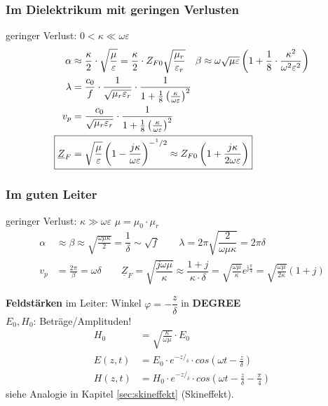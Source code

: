 \subsubsection{Im Dielektrikum mit geringen Verlusten}
geringer Verlust: $0 < \kappa \ll\omega\varepsilon$
\begin{align*}
	\alpha                  & \approx\dfrac{\kappa}{2}\cdot\sqrt{\dfrac{\mu}{\varepsilon}} = \frac{\kappa}{2}\cdot Z_{F0}\sqrt{\frac{\mu_r}{\varepsilon_r}}  \quad
	\beta \approx\omega\sqrt{\mu\varepsilon}\left(1+\dfrac{1}{8}\cdot\dfrac{\kappa^2}{\omega^2\varepsilon^2}\right)                                                                      \\
	\lambda                 & = \dfrac{c_0}{f}\cdot\dfrac{1}{\sqrt{\mu_r\varepsilon_r}}\cdot\frac{1}{1+\frac{1}{8}\left(\frac{\kappa}{\omega\varepsilon}\right)^2}                       \\
	v_p                     & = \dfrac{c_0}{\sqrt{\mu_r\varepsilon_r}}\cdot\frac{1}{1+\frac{1}{8}\left(\frac{\kappa}{\omega\varepsilon}\right)^2}                                        \\
	\Aboxed{\underline{Z}_F & = \sqrt{\dfrac{\mu}{\varepsilon}}\left(1-\frac{j\kappa}{\omega\varepsilon}\right)^{-^1/2} \approx Z_{F0}\left(1+\frac{j\kappa}{2\omega\varepsilon}\right)}
\end{align*}

\subsubsection{Im guten Leiter}\label{sec:Ausbreitug_guter_Leiter}
geringer Verlust: $\kappa \gg\omega\varepsilon$ \quad $\mu = \mu_0 \cdot \mu_r$
\begin{align*}
	\alpha & \approx \beta \approx\sqrt{\frac{\omega\mu\kappa}{2}}=\dfrac{1}{\delta}\sim\sqrt{f} \qquad
	\lambda                 = 2\pi \sqrt{\dfrac{2}{\omega\mu\kappa}}=2\pi\delta                         \\
	v_p    & = \frac{2\pi}{\beta} = \omega\delta        \qquad
	\boxed{\underline{Z}_F = \sqrt{\dfrac{j\omega\mu}{\kappa}} \approx \dfrac{1+j}{\kappa\cdot\delta} = \sqrt{\frac{\omega \mu}{\kappa}}e^{\mathrm{j}\frac{\pi}{4}} = \sqrt{\frac{\omega \mu}{2 \kappa}}(1+j)   }
\end{align*}

\textbf{Feldstärken} im Leiter: \qquad Winkel $\varphi = - \dfrac{z}{\delta}$ in \textbf{DEGREE}\\
$E_0, H_0$: Beträge/Amplituden!
\begin{align*}
	H_0    & = \sqrt{\frac{\kappa}{\omega \mu}}\cdot E_0                                    \\
	E(z,t) & = E_0 \cdot e^{- z/_\delta}\cdot cos(\omega t-\frac{z}{\delta})                \\
	H(z,t) & = H_0 \cdot e^{- z/_\delta}\cdot cos(\omega t- \frac{z}{\delta}-\frac{\pi}{4})
\end{align*}
siehe Analogie in Kapitel \ref{sec:skineffekt} (Skineffekt).

